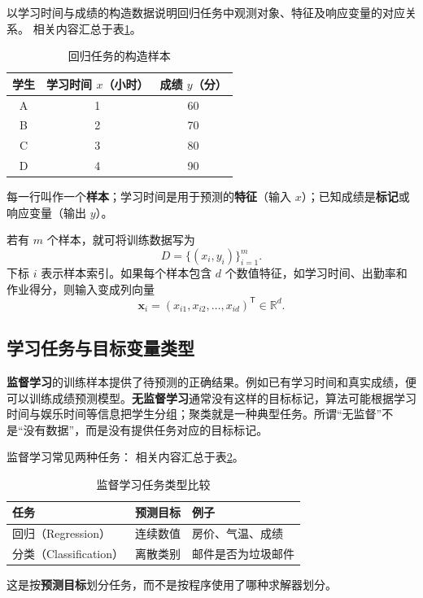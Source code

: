 以学习时间与成绩的构造数据说明回归任务中观测对象、特征及响应变量的对应关系。
相关内容汇总于表\ref{tab:foundation-samples}。
\begin{table}[htbp]\centering
\caption{回归任务的构造样本}\label{tab:foundation-samples}
\begin{tabular}{ccc}\toprule
学生&学习时间 $x$（小时）&成绩 $y$（分）\\\midrule
A&1&60\\ B&2&70\\ C&3&80\\ D&4&90\\\bottomrule
\end{tabular}
\end{table}
每一行叫作一个\textbf{样本}；学习时间是用于预测的\textbf{特征}（输入 $x$）；已知成绩是\textbf{标记}或响应变量（输出 $y$）。

若有 $m$ 个样本，就可将训练数据写为
\begin{equation}\label{eq:dataset}
D=\{(x_i,y_i)\}_{i=1}^{m}.
\end{equation}
下标 $i$ 表示样本索引。如果每个样本包含 $d$ 个数值特征，如学习时间、出勤率和作业得分，则输入变成列向量
\[
\boldsymbol{x}_i=(x_{i1},x_{i2},\ldots,x_{id})^{\mathsf T}\in\mathbb R^d.
\]

\subsection{学习任务与目标变量类型}

\textbf{监督学习}的训练样本提供了待预测的正确结果。例如已有学习时间和真实成绩，便可以训练成绩预测模型。\textbf{无监督学习}通常没有这样的目标标记，算法可能根据学习时间与娱乐时间等信息把学生分组；聚类就是一种典型任务。所谓“无监督”不是“没有数据”，而是没有提供任务对应的目标标记。

监督学习常见两种任务：
相关内容汇总于表\ref{tab:learning-tasks}。
\begin{table}[htbp]\centering
\caption{监督学习任务类型比较}\label{tab:learning-tasks}
\begin{tabular}{lll}\toprule
任务&预测目标&例子\\\midrule
回归（Regression）&连续数值&房价、气温、成绩\\
分类（Classification）&离散类别&邮件是否为垃圾邮件\\\bottomrule
\end{tabular}
\end{table}
这是按\textbf{预测目标}划分任务，而不是按程序使用了哪种求解器划分。


